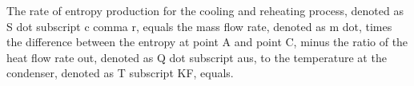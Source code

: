 The rate of entropy production for the cooling and reheating process, denoted as S dot subscript c comma r, equals the mass flow rate, denoted as m dot, times the difference between the entropy at point A and point C, minus the ratio of the heat flow rate out, denoted as Q dot subscript aus, to the temperature at the condenser, denoted as T subscript KF, equals.
